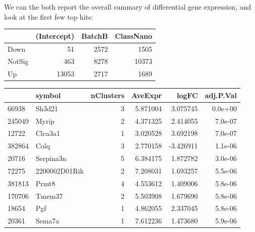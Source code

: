 \documentclass[9pt,a4paper,]{extarticle}
\newenvironment{Shaded}{\begin{snugshade}}{\end{snugshade}}
\newcommand{\KeywordTok}[1]{\textcolor[rgb]{0.13,0.29,0.53}{\textbf{{#1}}}}
\newcommand{\DataTypeTok}[1]{\textcolor[rgb]{0.13,0.29,0.53}{{#1}}}
\newcommand{\StringTok}[1]{\textcolor[rgb]{0.31,0.60,0.02}{{#1}}}
\newcommand{\CommentTok}[1]{\textcolor[rgb]{0.56,0.35,0.01}{\textit{{#1}}}}
\newcommand{\NormalTok}[1]{{#1}}
\begin{document}
We can the both report the overall summary of differential gene expression, and look at the first few top hits:

\begin{Shaded}
\end{Shaded}

\begin{tabular}{l|r|r|r}
\hline
  & (Intercept) & BatchB & ClassNano\\
\hline
Down & 51 & 2572 & 1505\\
\hline
NotSig & 463 & 8278 & 10373\\
\hline
Up & 13053 & 2717 & 1689\\
\hline
\end{tabular}

\begin{Shaded}
\end{Shaded}

\begin{tabular}{l|l|r|r|r|r}
\hline
  & symbol & nClusters & AveExpr & logFC & adj.P.Val\\
\hline
66938 & Sh3d21 & 3 & 5.871004 & 3.075745 & 0.0e+00\\
\hline
245049 & Myrip & 2 & 4.371325 & 2.414055 & 7.0e-07\\
\hline
12722 & Clca3a1 & 1 & 3.020528 & 3.692198 & 7.0e-07\\
\hline
382864 & Colq & 3 & 2.770158 & -3.426911 & 1.1e-06\\
\hline
20716 & Serpina3n & 5 & 6.384175 & 1.872782 & 3.0e-06\\
\hline
72275 & 2200002D01Rik & 2 & 7.208031 & 1.693257 & 5.5e-06\\
\hline
381813 & Prmt8 & 4 & 4.553612 & 1.409006 & 5.8e-06\\
\hline
170706 & Tmem37 & 2 & 5.503908 & 1.679690 & 5.8e-06\\
\hline
18654 & Pgf & 1 & 4.862055 & 2.337045 & 5.8e-06\\
\hline
20361 & Sema7a & 1 & 7.612236 & 1.473680 & 5.9e-06\\
\hline
\end{tabular}
\end{document}
